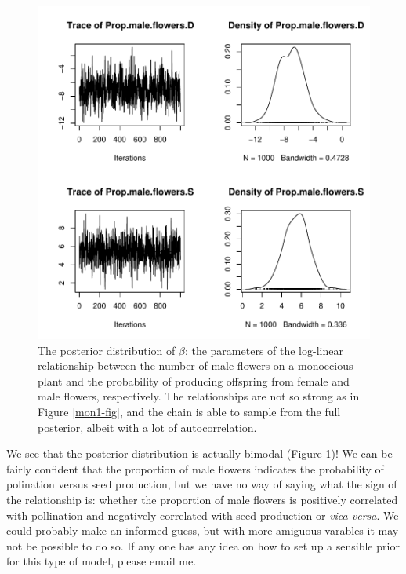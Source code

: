 \documentclass{article}
\begin{document}
\begin{figure}[!h]
\begin{center}
\includegraphics{Tutorial-099}
\end{center}
\caption{The posterior distribution of $\beta$: the parameters of the log-linear relationship between the number of male flowers on a monoecious plant and the probability of producing offspring from female and male flowers, respectively. The relationships are not so strong as in Figure \ref{mon1-fig}, and the chain is able to sample from the full posterior, albeit with a lot of autocorrelation.}
\label{mon2-fig}
\end{figure}

We see that the posterior distribution is actually bimodal (Figure \ref{mon2-fig})! We can be fairly confident that the proportion of male flowers indicates the probability of polination versus seed production, but we have no way of saying what the sign of the relationship is: whether the proportion of male flowers is positively correlated with pollination and negatively correlated with seed production or \emph{vica versa}.  We could probably make an informed guess, but with more amiguous varables it may not be possible to do so.  If any one has any idea on how to set up a sensible prior for this type of model, please email me.  
\end{document}
